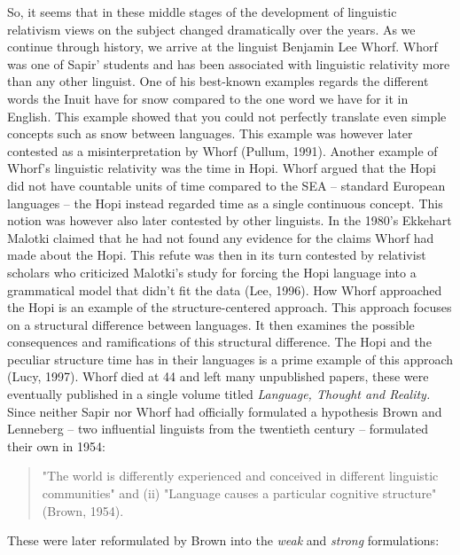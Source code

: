 So, it seems that in these middle stages of the development of linguistic relativism views on the subject changed dramatically over the years. As we continue through history, we arrive at the linguist Benjamin Lee Whorf. Whorf was one of Sapir’ students and has been associated with linguistic relativity more than any other linguist. One of his best-known examples regards the different words the Inuit have for snow compared to the one word we have for it in English. This example showed that you could not perfectly translate even simple concepts such as snow between languages. This example was however later contested as a misinterpretation by Whorf (Pullum, 1991). Another example of Whorf’s linguistic relativity was the time in Hopi. Whorf argued that the Hopi did not have countable units of time compared to the SEA – standard European languages – the Hopi instead regarded time as a single continuous concept. This notion was however also later contested by other linguists. In the 1980’s Ekkehart Malotki claimed that he had not found any evidence for the claims Whorf had made about the Hopi. This refute was then in its turn contested by relativist scholars who criticized Malotki’s study for forcing the Hopi language into a grammatical model that didn’t fit the data (Lee, 1996). How Whorf approached the Hopi is an example of the structure-centered approach. This approach focuses on a structural difference between languages. It then examines the possible consequences and ramifications of this structural difference. The Hopi and the peculiar structure time has in their languages is a prime example of this approach (Lucy, 1997).  Whorf died at 44 and left many unpublished papers, these were eventually published in a single volume titled \textit{Language, Thought and Reality.} Since neither Sapir nor Whorf had officially formulated a hypothesis Brown and Lenneberg – two influential linguists from the twentieth century – formulated their own in 1954:  

\begin{quote}
\begin{singlespace}
"The world is differently experienced and conceived in different linguistic communities" and (ii) "Language causes a particular cognitive structure" (Brown, 1954).
\end{singlespace}
\end{quote}

These were later reformulated by Brown into the \textit{weak} and \textit{strong} formulations: 


